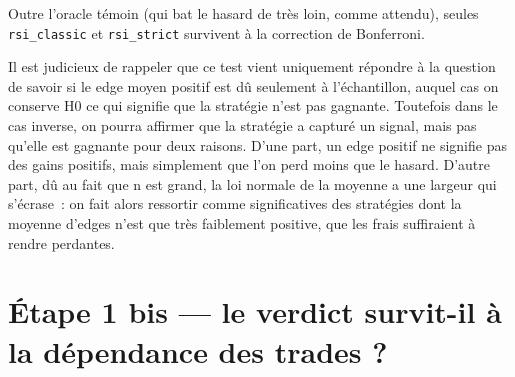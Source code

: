 Outre l'oracle témoin (qui bat le hasard de très loin, comme attendu),
seules \texttt{rsi\_classic} et \texttt{rsi\_strict} survivent à la
correction de Bonferroni.

Il est judicieux de rappeler que ce test vient uniquement répondre à la question de savoir 
si le edge moyen positif est dû seulement à l'échantillon, auquel cas on conserve H0 ce qui
signifie que la stratégie n'est pas gagnante.
Toutefois dans le cas inverse, on pourra affirmer que la stratégie a capturé un signal,
mais pas qu'elle est gagnante pour deux raisons. 
D'une part, un edge positif ne signifie pas des gains positifs, mais simplement que l'on perd moins que le hasard. 
D'autre part, dû au fait que n est grand, la loi normale de la moyenne a une largeur qui s'écrase~: 
on fait alors ressortir comme significatives des stratégies dont la moyenne d'edges n'est que très 
faiblement positive, que les frais suffiraient à rendre perdantes.




\section{Étape 1 bis --- le verdict survit-il à la dépendance des trades ?}
\label{sec:b1-dependance}

